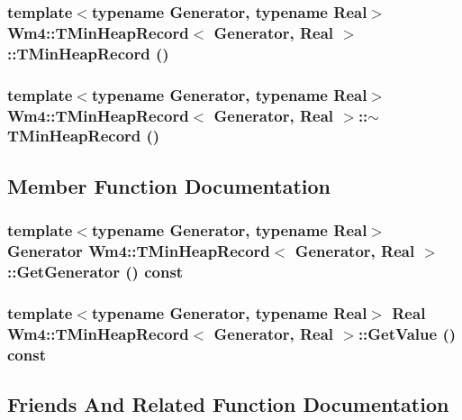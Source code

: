 \subsubsection{\setlength{\rightskip}{0pt plus 5cm}template$<$typename Generator, typename Real$>$ {\bf Wm4::TMin\-Heap\-Record}$<$ Generator, Real $>$::{\bf TMin\-Heap\-Record} ()}\label{classWm4_1_1TMinHeapRecord_768978badba3856ae212806b86c68345}


\subsubsection{\setlength{\rightskip}{0pt plus 5cm}template$<$typename Generator, typename Real$>$ {\bf Wm4::TMin\-Heap\-Record}$<$ Generator, Real $>$::$\sim${\bf TMin\-Heap\-Record} ()}\label{classWm4_1_1TMinHeapRecord_9b3f8321f3595b8f6d66ceeaf88154fb}




\subsection{Member Function Documentation}
\subsubsection{\setlength{\rightskip}{0pt plus 5cm}template$<$typename Generator, typename Real$>$ Generator {\bf Wm4::TMin\-Heap\-Record}$<$ Generator, Real $>$::Get\-Generator () const}\label{classWm4_1_1TMinHeapRecord_e93d74379d9efcd85430a2a1c959c86e}


\subsubsection{\setlength{\rightskip}{0pt plus 5cm}template$<$typename Generator, typename Real$>$ Real {\bf Wm4::TMin\-Heap\-Record}$<$ Generator, Real $>$::Get\-Value () const}\label{classWm4_1_1TMinHeapRecord_b10a9c41b2cf893521db8df9fedb5673}




\subsection{Friends And Related Function Documentation}
